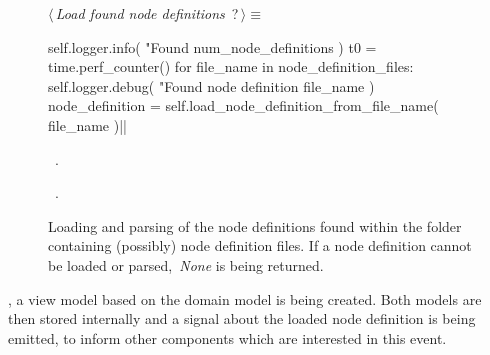 \documentclass[%
    a4paper,    %
    justified,  %
    nobib,      %
    openany     %
]{tufte-book}
\makeatletter
\renewcommand{\label}[1]{\@tufte@label{##1}}%
\makeatother
\begin{document}
\begin{figure}[!h]
  \begin{flushleft} \small
\begin{minipage}{\linewidth}\label{scrap7}\raggedright\small
{} $\langle\,${\itshape Load found node definitions}\nobreak\ {\footnotesize {?}}$\,\rangle\equiv$
\vspace{-1ex}
\begin{pythoncode}
self.logger.info(
    "Found %
    num_node_definitions
)
t0 = time.perf_counter()
for file_name in node_definition_files:
    self.logger.debug(
        "Found node definition %
        file_name
    )
    node_definition = self.load_node_definition_from_file_name(
        file_name
    )|\NWsep|
\end{pythoncode}
\vspace{1.5ex}
\footnotesize
\begin{list}{}{\setlength{\itemsep}{-\parsep}\setlength{\itemindent}{-\leftmargin}}
\item \NWtxtMacroDefBy\ .
\item \NWtxtMacroRefIn\ .

\item{}
\end{list}
\end{minipage}\vspace{4ex}
\end{flushleft}
\caption{Loading and parsing of the node definitions found within the folder
    containing (possibly) node definition files. If a node definition cannot be
    loaded or parsed,~\textit{None} is being returned.}
  \label{lst:nodes-controller-load-node-defs}
\end{figure}

\newpage{}

, a view model based on the
domain model is being created. Both models are then stored internally and a
signal about the loaded node definition is being emitted, to inform other
components which are interested in this event.
\end{document}
